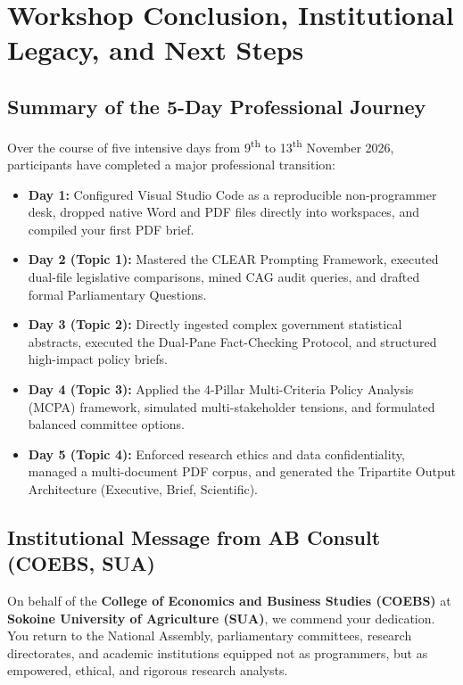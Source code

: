 \documentclass[11pt, a4paper]{report}
\begin{document}
\newpage

\chapter{Workshop Conclusion, Institutional Legacy, and Next Steps}

\section{Summary of the 5-Day Professional Journey}
Over the course of five intensive days from 9\textsuperscript{th} to 13\textsuperscript{th} November 2026, participants have completed a major professional transition:
\begin{itemize}[label=-]
    \item \textbf{Day 1:} Configured Visual Studio Code as a reproducible non-programmer desk, dropped native Word and PDF files directly into workspaces, and compiled your first PDF brief.
    \item \textbf{Day 2 (Topic 1):} Mastered the CLEAR Prompting Framework, executed dual-file legislative comparisons, mined CAG audit queries, and drafted formal Parliamentary Questions.
    \item \textbf{Day 3 (Topic 2):} Directly ingested complex government statistical abstracts, executed the Dual-Pane Fact-Checking Protocol, and structured high-impact policy briefs.
    \item \textbf{Day 4 (Topic 3):} Applied the 4-Pillar Multi-Criteria Policy Analysis (MCPA) framework, simulated multi-stakeholder tensions, and formulated balanced committee options.
    \item \textbf{Day 5 (Topic 4):} Enforced research ethics and data confidentiality, managed a multi-document PDF corpus, and generated the Tripartite Output Architecture (Executive, Brief, Scientific).
\end{itemize}

\section{Institutional Message from AB Consult (COEBS, SUA)}
On behalf of the \textcolor{suagreen}{\textbf{College of Economics and Business Studies (COEBS)}} at \textcolor{tanzaniablue}{\textbf{Sokoine University of Agriculture (SUA)}}, we commend your dedication. You return to the National Assembly, parliamentary committees, research directorates, and academic institutions equipped not as programmers, but as empowered, ethical, and rigorous research analysts. 
\end{document}
